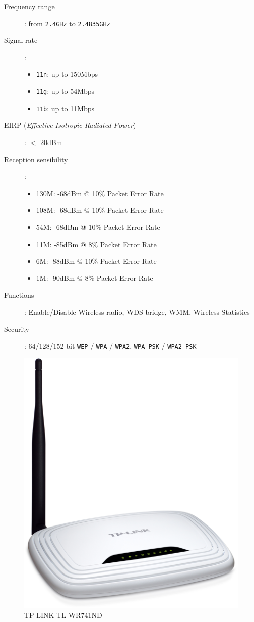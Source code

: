 \begin{description}
	\item [Frequency range]: from \texttt{2.4GHz} to \texttt{2.4835GHz}
	\item [Signal rate]:
		\begin{itemize}
			\item \texttt{11n}: up to 150Mbps
			\item \texttt{11g}: up to 54Mbps
			\item \texttt{11b}: up to 11Mbps
		\end{itemize}
	\item [EIRP (\textit{Effective Isotropic Radiated Power})]: $<$ 20dBm 
	\item [Reception sensibility]:
		\begin{itemize}
			\item 130M: -68dBm @ 10\% Packet Error Rate
			\item 108M: -68dBm @ 10\% Packet Error Rate
			\item 54M: -68dBm @ 10\% Packet Error Rate
			\item 11M: -85dBm @ 8\% Packet Error Rate
			\item 6M: -88dBm @ 10\% Packet Error Rate
			\item 1M: -90dBm @ 8\% Packet Error Rate
		\end{itemize}
	\item [Functions]: Enable/Disable Wireless radio, WDS bridge, WMM, Wireless Statistics
	\item [Security]: 64/128/152-bit \texttt{WEP} / \texttt{WPA} / \texttt{WPA2}, \texttt{WPA-PSK} / \texttt{WPA2-PSK}
\end{description}

\begin{figure}[H]
	\begin{center}
		\includegraphics[width=0.2\linewidth]{Pictures/chapter4/router.jpg}
		\caption{TP-LINK TL-WR741ND}
	\end{center}
\end{figure}


